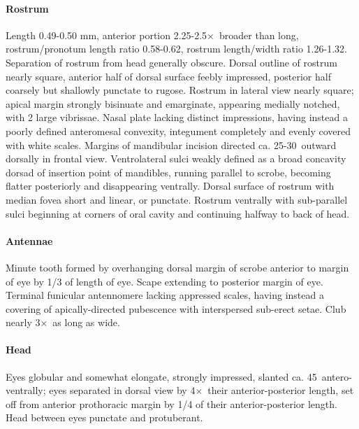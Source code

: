 \documentclass[fleqn,10pt,lineno]{wlpeerj} %
\newcommand{\td}{\textdegree~}
\newcommand{\x}{$\times$~}
\begin{document}
			\paragraph{Rostrum}
				Length 0.49-0.50 mm, anterior portion 2.25-2.5\x broader than long, rostrum/pronotum length ratio 0.58-0.62, rostrum length/width ratio 1.26-1.32.
				Separation of rostrum from head generally obscure. 
				Dorsal outline of rostrum nearly square, anterior half of dorsal surface feebly impressed, posterior half coarsely but shallowly punctate to rugose. 
				Rostrum in lateral view nearly square; apical margin strongly bisinuate and emarginate, appearing medially notched, with 2 large vibrissae. 
				Nasal plate lacking distinct impressions, having instead a poorly defined anteromesal convexity, integument completely and evenly covered with white scales. 
				Margins of mandibular incision directed ca. 25-30\td outward dorsally in frontal view. 
				Ventrolateral sulci weakly defined as a broad concavity dorsad of insertion point of mandibles, running parallel to scrobe, becoming flatter posteriorly and disappearing ventrally.
				Dorsal surface of rostrum with median fovea short and linear, or punctate.
				Rostrum ventrally with sub-parallel sulci beginning at corners of oral cavity and continuing halfway to back of head.
			\paragraph{Antennae}
				Minute tooth formed by overhanging dorsal margin of scrobe anterior to margin of eye by 1/3 of length of eye.
				Scape extending to posterior margin of eye.
				Terminal funicular antennomere lacking appressed scales, having instead a covering of apically-directed pubescence with interspersed sub-erect setae.
				Club nearly 3\x as long as wide.
			\paragraph{Head}
				Eyes globular and somewhat elongate, strongly impressed, slanted ca. 45\td antero-ventrally; eyes separated in dorsal view by 4\x their anterior-posterior length, set off from anterior prothoracic margin by 1/4 of their anterior-posterior length. 
				Head between eyes punctate and protuberant.
\end{document}
